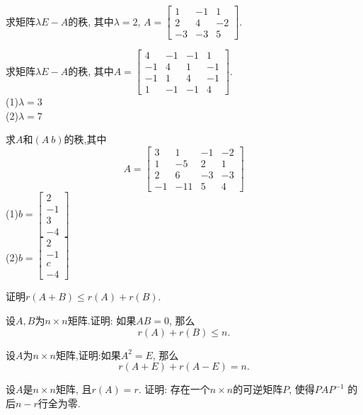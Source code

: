 \begin{ex}\label{4.21}
求矩阵$\lambda E-A$的秩, 其中$\lambda=2$, $A=\begin{bmatrix}1&-1&1\\2&4&-2\\-3&-3&5\end{bmatrix}$.
\end{ex}

\begin{ex}\label{4.22}
求矩阵$\lambda E-A$的秩, 其中$A=\begin{bmatrix}4&-1&-1&1\\-1&4&1&-1\\-1&1&4&-1\\1&-1&-1&4\end{bmatrix}$.\\
(1)$\lambda=3$\\
(2)$\lambda=7$
\end{ex}

\begin{ex}\label{4.23}
求$A$和$(A\ b)$的秩,其中
$$A=\begin{bmatrix}3&1&-1&-2\\1&-5&2&1\\2&6&-3&-3\\-1&-11&5&4\end{bmatrix}$$
(1)$b=\begin{bmatrix}2\\-1\\3\\-4\end{bmatrix}$ \\
(2)$b=\begin{bmatrix}2\\-1\\c\\-4\end{bmatrix}$
\end{ex}

\begin{ex}\label{4.24}
证明$r(A+B)\leq r(A)+r(B).$
\end{ex}

\begin{ex}\label{4.25}
设$A,B$为$n\times n$矩阵.证明: 如果$AB=0$, 那么$$r(A)+r(B)\leq n.$$
\end{ex}

\begin{ex}\label{4.26}
设$A$为$n\times n$矩阵,证明:如果$A^2=E$, 那么$$r(A+E)+r(A-E)=n.$$
\end{ex}

\begin{ex}\label{4.27}
设$A$是$n\times n$矩阵, 且$r(A)=r$. 证明: 存在一个$n\times n$的可逆矩阵$P$, 使得$PAP^{-1}$ 的后$n-r$行全为零.
\end{ex}


